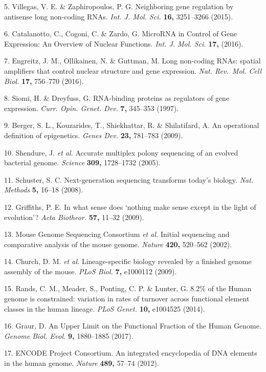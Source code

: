 \documentclass[11pt,twoside]{MPIthesis}
\theoremstyle{definition}
\theoremstyle{definition}
\theoremstyle{definition}
\theoremstyle{remark}
\begin{document}
5. Villegas, V. E. \& Zaphiropoulos, P. G. Neighboring gene regulation
by antisense long non-coding RNAs. \emph{Int. J. Mol. Sci.} \textbf{16,}
3251--3266 (2015).

6. Catalanotto, C., Cogoni, C. \& Zardo, G. MicroRNA in Control of Gene
Expression: An Overview of Nuclear Functions. \emph{Int. J. Mol. Sci.}
\textbf{17,} (2016).

7. Engreitz, J. M., Ollikainen, N. \& Guttman, M. Long non-coding RNAs:
spatial amplifiers that control nuclear structure and gene expression.
\emph{Nat. Rev.~Mol. Cell Biol.} \textbf{17,} 756--770 (2016).

8. Siomi, H. \& Dreyfuss, G. RNA-binding proteins as regulators of gene
expression. \emph{Curr. Opin. Genet. Dev.} \textbf{7,} 345--353 (1997).

9. Berger, S. L., Kouzarides, T., Shiekhattar, R. \& Shilatifard, A. An
operational definition of epigenetics. \emph{Genes Dev.} \textbf{23,}
781--783 (2009).

10. Shendure, J. \emph{et al.} Accurate multiplex polony sequencing of
an evolved bacterial genome. \emph{Science} \textbf{309,} 1728--1732
(2005).

11. Schuster, S. C. Next-generation sequencing transforms today's
biology. \emph{Nat. Methods} \textbf{5,} 16--18 (2008).

12. Griffiths, P. E. In what sense does `nothing make sense except in
the light of evolution'? \emph{Acta Biotheor.} \textbf{57,} 11--32
(2009).

13. Mouse Genome Sequencing Consortium \emph{et al.} Initial sequencing
and comparative analysis of the mouse genome. \emph{Nature}
\textbf{420,} 520--562 (2002).

14. Church, D. M. \emph{et al.} Lineage-specific biology revealed by a
finished genome assembly of the mouse. \emph{PLoS Biol.} \textbf{7,}
e1000112 (2009).

15. Rands, C. M., Meader, S., Ponting, C. P. \& Lunter, G. 8.2\% of the
Human genome is constrained: variation in rates of turnover across
functional element classes in the human lineage. \emph{PLoS Genet.}
\textbf{10,} e1004525 (2014).

16. Graur, D. An Upper Limit on the Functional Fraction of the Human
Genome. \emph{Genome Biol. Evol.} \textbf{9,} 1880--1885 (2017).

17. ENCODE Project Consortium. An integrated encyclopedia of DNA
elements in the human genome. \emph{Nature} \textbf{489,} 57--74 (2012).
\end{document}
